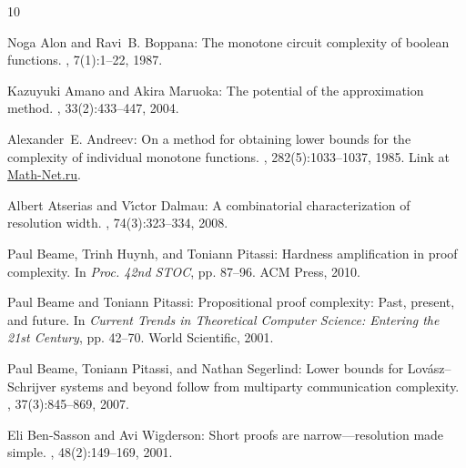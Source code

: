 \documentclass[11pt]{article}
\numberwithin{equation}{section}
\theoremstyle{definition}
\theoremstyle{plain}
\begin{document}
\tocrefpdfbookmark
\begin{thebibliography}{10}

{\sc Noga Alon and Ravi~B. Boppana}: The monotone circuit complexity of boolean
  functions.
, 7(1):1--22, 1987.
\newblock [\epfmtdoi{10.1007/BF02579196}]

{\sc Kazuyuki Amano and Akira Maruoka}: The potential of the approximation
  method.
, 33(2):433--447, 2004.
\newblock [\epfmtdoi{10.1137/S009753970138445X}]

{\sc Alexander~E. Andreev}: On a method for obtaining lower bounds for the
  complexity of individual monotone functions.
, 282(5):1033--1037, 1985.
\newblock Link at
  \href{http://www.mathnet.ru/php/archive.phtml?wshow=paper&jrnid=dan&paperid=9107&option_lang=eng}{Math-Net.ru}.

{\sc Albert Atserias and V{\'\i}ctor Dalmau}: A combinatorial characterization
  of resolution width.
, 74(3):323--334, 2008.

{\sc Paul Beame, Trinh Huynh, and Toniann Pitassi}: Hardness amplification in
  proof complexity.
\newblock In {\em Proc. 42nd STOC}, pp. 87--96. ACM Press, 2010.
\newblock [\epfmtdoi{10.1145/1806689.1806703}]

{\sc Paul Beame and Toniann Pitassi}: Propositional proof complexity: Past,
  present, and future.
\newblock In {\em Current Trends in Theoretical Computer Science: Entering the
  21st Century}, pp. 42--70. World Scientific, 2001.

{\sc Paul Beame, Toniann Pitassi, and Nathan Segerlind}: Lower bounds for
  {L}ov{\'a}sz--{S}chrijver systems and beyond follow from multiparty
  communication complexity.
, 37(3):845--869, 2007.
\newblock [\epfmtdoi{10.1137/060654645}]

{\sc Eli Ben{-}Sasson and Avi Wigderson}: Short proofs are narrow---resolution
  made simple.
, 48(2):149--169, 2001.
\newblock [\epfmtdoi{10.1145/375827.375835}]


\end{thebibliography}
\end{document}
